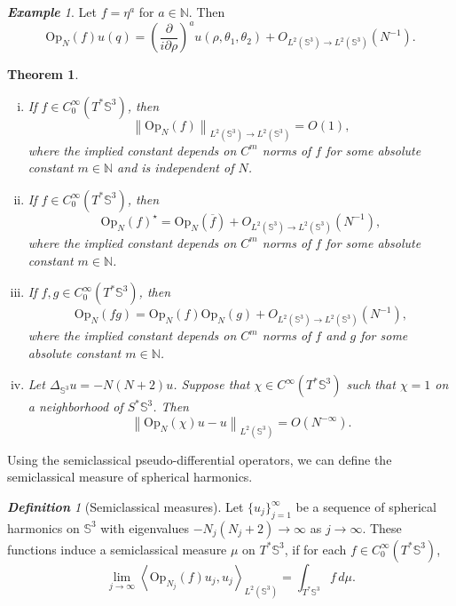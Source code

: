 \documentclass[12pt,reqno]{amsart}
\newcommand\N{\mathbb{N}}
\newcommand\ol{\overline}
\newcommand\Op{\mathrm{Op}}
\newcommand\Sb{\mathbb{S}}
\theoremstyle{plain}
\newtheorem{thm}{Theorem}
\theoremstyle{remark}
\newtheorem*{defn}{\textbf{Definition}}
\newtheorem*{ex}{\textbf{Example}}
\numberwithin{equation}{section}
\begin{document}
\begin{ex}
Let $f=\eta^a$ for $a\in\N$. Then 
$$\Op_N(f)u(q)=\left(\frac{\partial}{i\partial\rho}\right)^au\left(\rho,\theta_1,\theta_2\right)+O_{L^2(\Sb^3)\to L^2(\Sb^3)}\left(N^{-1}\right ).$$
\end{ex}

\begin{thm}\label{thm:sdo}\hfill
\begin{enumerate}[(i).]
\item If $f\in C^\infty_0(T^*\Sb^3)$, then
$$\left\|\Op_N(f)\right\|_{L^2(\Sb^3)\to L^2(\Sb^3)}=O(1),$$
where the implied constant depends on $C^m$ norms of $f$ for some absolute constant $m\in\N$ and is independent of $N$. 
\item If $f\in C^\infty_0(T^*\Sb^3)$, then
$$\Op_N(f)^\star=\Op_N\left(\ol f\right)+O_{L^2(\Sb^3)\to L^2(\Sb^3)}\left(N^{-1}\right),$$
where the implied constant depends on $C^m$ norms of $f$ for some absolute constant $m\in\N$.
\item If $f,g\in C^\infty_0(T^*\Sb^3)$, then
$$\Op_N(fg)=\Op_N(f)\Op_N(g)+O_{L^2(\Sb^3)\to L^2(\Sb^3)}\left(N^{-1}\right),$$
where the implied constant depends on $C^m$ norms of $f$ and $g$ for some absolute constant $m\in\N$.
\item Let $\Delta_{\Sb^3}u=-N(N+2)u$. Suppose that $\chi\in C^\infty(T^*\Sb^3)$ such that $\chi=1$ on a neighborhood of $S^*\Sb^3$. Then
$$\left\|\Op_N(\chi)u-u\right\|_{L^2(\Sb^3)}=O\left(N^{-\infty}\right).$$
\end{enumerate}
\end{thm}

Using the semiclassical pseudo-differential operators, we can define the semiclassical measure of spherical harmonics.

\begin{defn}[Semiclassical measures]
Let $\{u_j\}_{j=1}^\infty$ be a sequence of spherical harmonics on $\Sb^3$ with eigenvalues $-N_j(N_j+2)\to\infty$ as $j\to\infty$. These functions induce a semiclassical measure $\mu$ on $T^*\Sb^3$, if for each $f\in C_0^\infty(T^*\Sb^3)$,
$$\lim_{j\to\infty}\left\langle\Op_{N_j}(f)u_j,u_j\right\rangle_{L^2(\Sb^3)}=\int_{T^*\Sb^3}f\,d\mu.$$
\end{defn}
\end{document}
